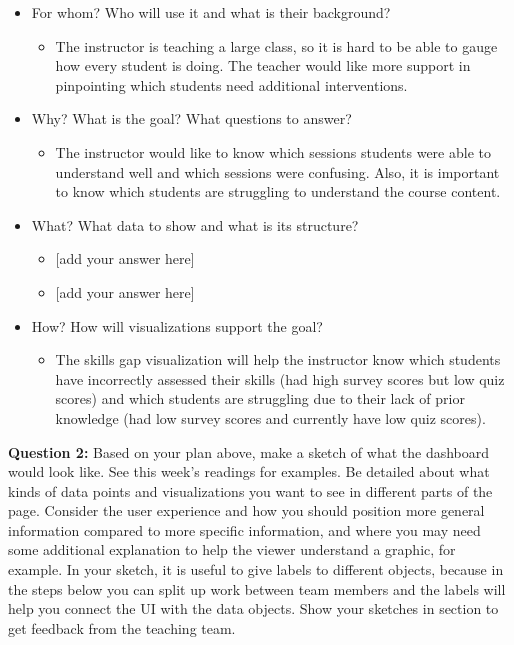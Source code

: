 \documentclass[
]{article}
\providecommand{\tightlist}{%
  \setlength{\itemsep}{0pt}\setlength{\parskip}{0pt}}
\begin{document}
\begin{itemize}
\tightlist
\item
  For whom? Who will use it and what is their background?

  \begin{itemize}
  \tightlist
  \item
    The instructor is teaching a large class, so it is hard to be able
    to gauge how every student is doing. The teacher would like more
    support in pinpointing which students need additional interventions.
  \end{itemize}
\item
  Why? What is the goal? What questions to answer?

  \begin{itemize}
  \tightlist
  \item
    The instructor would like to know which sessions students were able
    to understand well and which sessions were confusing. Also, it is
    important to know which students are struggling to understand the
    course content.
  \end{itemize}
\item
  What? What data to show and what is its structure?

  \begin{itemize}
  \tightlist
  \item
    {[}add your answer here{]}
  \item
    {[}add your answer here{]}
  \end{itemize}
\item
  How? How will visualizations support the goal?

  \begin{itemize}
  \tightlist
  \item
    The skills gap visualization will help the instructor know which
    students have incorrectly assessed their skills (had high survey
    scores but low quiz scores) and which students are struggling due to
    their lack of prior knowledge (had low survey scores and currently
    have low quiz scores).
  \end{itemize}
\end{itemize}

\textbf{Question 2:} Based on your plan above, make a sketch of what the
dashboard would look like. See this week's readings for examples. Be
detailed about what kinds of data points and visualizations you want to
see in different parts of the page. Consider the user experience and how
you should position more general information compared to more specific
information, and where you may need some additional explanation to help
the viewer understand a graphic, for example. In your sketch, it is
useful to give labels to different objects, because in the steps below
you can split up work between team members and the labels will help you
connect the UI with the data objects. Show your sketches in section to
get feedback from the teaching team.
\end{document}

